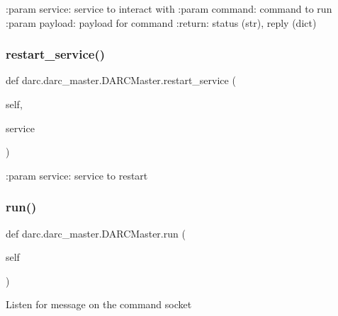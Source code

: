 \begin{DoxyVerb}:param service: service to interact with
:param command: command to run
:param payload: payload for command
:return: status (str), reply (dict)
\end{DoxyVerb}
 \mbox{\label{classdarc_1_1darc__master_1_1_d_a_r_c_master_ad77bc3ecaa7973c103d09e1a5d465f69}} 
\subsubsection{\texorpdfstring{restart\_service()}{restart\_service()}}
{\footnotesize\ttfamily def darc.\+darc\+\_\+master.\+D\+A\+R\+C\+Master.\+restart\+\_\+service (\begin{DoxyParamCaption}\item[{}]{self,  }\item[{}]{service }\end{DoxyParamCaption})}

\begin{DoxyVerb}:param service: service to restart
\end{DoxyVerb}
 \mbox{\label{classdarc_1_1darc__master_1_1_d_a_r_c_master_af3ae1767344d86ac8a6bdaa57790f3eb}} 
\subsubsection{\texorpdfstring{run()}{run()}}
{\footnotesize\ttfamily def darc.\+darc\+\_\+master.\+D\+A\+R\+C\+Master.\+run (\begin{DoxyParamCaption}\item[{}]{self }\end{DoxyParamCaption})}

\begin{DoxyVerb}Listen for message on the command socket
\end{DoxyVerb}
 \mbox{\label{classdarc_1_1darc__master_1_1_d_a_r_c_master_a83109658830d6b9993c1d3a515351ca0}} 
